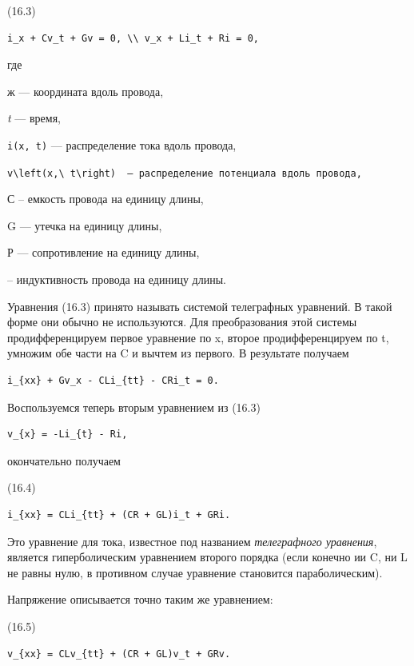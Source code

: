 \documentclass[
  ukrainian,
]{article}
\begin{document}
(16.3)

\begin{verbatim}
i_x + Cv_t + Gv = 0, \\ v_x + Li_t + Ri = 0,
\end{verbatim}

где

ж --- координата вдоль провода,

\emph{t} --- время,

\texttt{i(x,\ t)} --- распределение тока вдоль провода,

\texttt{\textquotesingle{}v\textbackslash{}left(x,\textbackslash{}\ t\textbackslash{}right)\textquotesingle{}\ \ —\ распределение\ потенциала\ вдоль\ провода,}

С -- емкость провода на единицу длины,

G --- утечка на единицу длины,

Р --- сопротивление на единицу длины,

-- индуктивность провода на единицу длины.

Уравнения (16.3) принято называть системой телеграфных уравнений. В
такой форме они обычно не используются. Для преобразования этой системы
продифференцируем первое уравнение по x, второе продифференцируем по t,
умножим обе части на C и вычтем из первого. В результате получаем

\begin{verbatim}
i_{xx} + Gv_x - CLi_{tt} - CRi_t = 0.
\end{verbatim}

Воспользуемся теперь вторым уравнением из (16.3)

\begin{verbatim}
v_{x} = -Li_{t} - Ri,
\end{verbatim}

окончательно получаем

(16.4)

\begin{verbatim}
i_{xx} = CLi_{tt} + (CR + GL)i_t + GRi.
\end{verbatim}

Это уравнение для тока, известное под названием \emph{телеграфного
уравнения}, является гиперболическим уравнением второго порядка (если
конечно ии C, ни L не равны нулю, в противном случае уравнение
становится параболическим).

Напряжение описывается точно таким же уравнением:

(16.5)

\begin{verbatim}
v_{xx} = CLv_{tt} + (CR + GL)v_t + GRv.
\end{verbatim}
\end{document}
